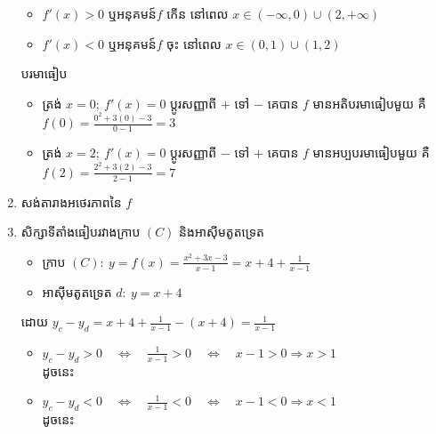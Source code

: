 \documentclass[expologarit]{subfiles}
\begin{document}
\begin{enumerate}[k]
\begin{itemize}
\item $f'(x)>0$ ឬអនុគមន៍$f$ កើន នៅពេល $x\in\left(-\infty ,0\right)\cup\left(2,+\infty\right)$
\item  $f'(x)<0$ ឬអនុគមន៍$f$ ចុះ នៅពេល $x\in\left(0 ,1\right)\cup\left(1,2\right)$
\end{itemize}
 បរមាធៀប 
\begin{itemize}
\item ត្រង់ $x=0;\ f'(x)=0$ ប្តូរសញ្ញាពី $+$ ទៅ $-$ គេបាន $f$ មានអតិបរមាធៀបមួយ គឺ\\[0.25cm] $f(0)=\frac{0^2+3(0)-3}{0-1}=3$
\item ត្រង់ $x=2;\ f'(x)=0$ ប្តូរសញ្ញាពី $-$ ទៅ $+$ គេបាន $f$ មានអប្បបរមាធៀបមួយ គឺ\\[0.25cm] $f(2)=\frac{2^2+3(2)-3}{2-1}=7$
\end{itemize}
\newpage 
\item សង់តារាងអថេរភាពនៃ $f$\\[0.2cm]
\item សិក្សាទីតាំងធៀបរវាងក្រាប $(C)$ និងអាស៊ីមតូតទ្រេត
\begin{itemize}
\item ក្រាប $(C):\ y=f(x)=\frac{x^2+3x-3}{x-1}=x+4+\frac{1}{x-1}$
\item អាស៊ីមតូតទ្រេត $d:\ y=x+4$ 
\end{itemize}
ដោយ $y_c-y_d= x+4+\frac{1}{x-1}-(x+4)=\frac{1}{x-1} $
\begin{itemize}[p]
\item $y_c-y_d>0\quad \Leftrightarrow\quad \frac{1}{x-1}>0 \quad \Leftrightarrow\quad x-1>0\Rightarrow x>1$\\[0.25cm]
ដូចនេះ 
\item $y_c-y_d<0\quad \Leftrightarrow\quad \frac{1}{x-1}<0 \quad \Leftrightarrow\quad x-1<0\Rightarrow x<1$\\[0.25cm]
ដូចនេះ 

\end{itemize}
\end{enumerate}
\end{document}
